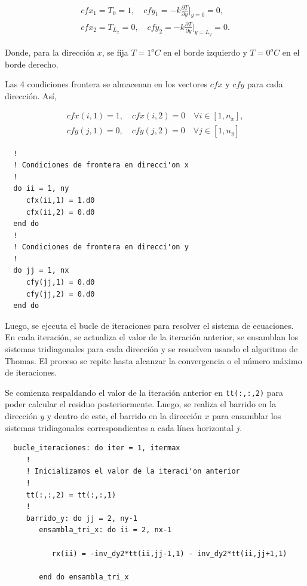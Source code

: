 \documentclass[11pt,a4paper]{article}
\begin{document}
\begin{equation}
  \begin{array}{l}
    cfx_1 = T_0 = 1, \quad cfy_1 = -k \frac{\partial T}{\partial y}\bigg|_{y=0} = 0, \\
    cfx_{2} = T_{L_x} = 0, \quad cfy_{2} = -k \frac{\partial T}{\partial y}\bigg|_{y=L_y} = 0.
  \end{array}
\end{equation}

Donde, para la direcci\'on $x$, se fija $T=1^{o}C$ en el borde izquierdo y
$T=0^{o}C$ en el borde derecho.

\medskip

Las 4 condiciones frontera se almacenan en los vectores \texttt{$cfx$} 
y \texttt{$cfy$} para cada direcci\'on. As\'i,

\begin{equation}
  \begin{array}{l}
    cfx(i,1) = 1, \quad cfx(i,2) = 0 \quad \forall i \in [1, n_x], \\
    cfy(j,1) = 0, \quad cfy(j,2) = 0 \quad \forall j \in [1, n_y]
  \end{array}
\end{equation}

\begin{verbatim}
  !
  ! Condiciones de frontera en direcci'on x
  !
  do ii = 1, ny
     cfx(ii,1) = 1.d0
     cfx(ii,2) = 0.d0
  end do
  !
  ! Condiciones de frontera en direcci'on y
  !
  do jj = 1, nx
     cfy(jj,1) = 0.d0
     cfy(jj,2) = 0.d0
  end do
\end{verbatim}

Luego, se ejecuta el bucle de iteraciones para resolver el sistema de 
ecuaciones. En cada iteración, se actualiza el valor de la iteración anterior, 
se ensamblan los sistemas tridiagonales para cada dirección y se resuelven 
usando el algoritmo de Thomas. El proceso se repite hasta alcanzar la 
convergencia o el número máximo de iteraciones.

\medskip

Se  comienza respaldando el valor de la iteraci\'on anterior en 
\texttt{tt(:,:,2)} para poder calcular el residuo posteriormente. Luego, se 
realiza el barrido en la direcci\'on $y$ y dentro de este, el barrido en la 
direcci\'on $x$ para ensamblar los sistemas tridiagonales correspondientes a 
cada línea horizontal $j$.

\begin{verbatim}
  bucle_iteraciones: do iter = 1, itermax
     !
     ! Inicializamos el valor de la iteraci'on anterior
     !
     tt(:,:,2) = tt(:,:,1)
     !
     barrido_y: do jj = 2, ny-1
        ensambla_tri_x: do ii = 2, nx-1

           rx(ii) = -inv_dy2*tt(ii,jj-1,1) - inv_dy2*tt(ii,jj+1,1)
           
        end do ensambla_tri_x
\end{verbatim}
\end{document}
